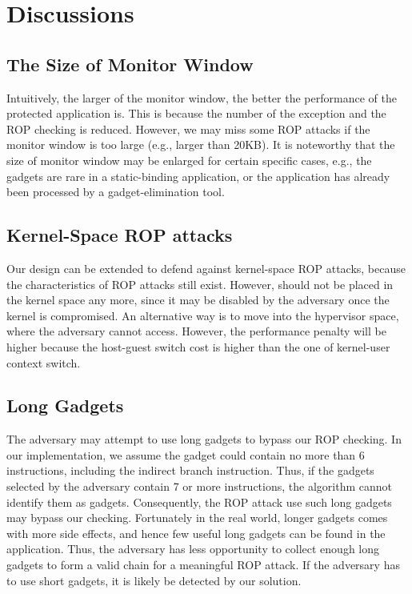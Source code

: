 \section{Discussions} \label{sec:dis}

\subsection{The Size of Monitor Window}
Intuitively, the larger of the monitor window, the better the performance of the protected application is. This is because the number of the exception and the ROP checking is reduced. However, we may miss some ROP attacks if the monitor window is too large (e.g., larger than 20KB). It is noteworthy that the size of monitor window may be enlarged for certain specific cases, e.g., the gadgets are rare in a static-binding application, or the application has already been processed by a gadget-elimination tool.



\subsection{Kernel-Space ROP attacks}
Our design can be extended to defend against kernel-space ROP attacks, because the characteristics of ROP attacks still exist.
However, \name should not be placed in the kernel space any more, since it may be disabled by the adversary once the kernel is compromised.
An alternative way is to move \name into the hypervisor space, where the adversary cannot access.
However, the performance penalty will be higher because the host-guest switch cost is higher than the one of kernel-user context switch.

\subsection{Long Gadgets}
The adversary may attempt to use long gadgets to bypass our ROP checking. In our implementation, we assume the gadget could contain no more than 6 instructions, including the indirect branch instruction. Thus, if the gadgets selected by the adversary contain 7 or more instructions, the algorithm cannot identify them as gadgets. Consequently, the ROP attack use such long gadgets may bypass our checking. Fortunately in the real world, longer gadgets comes with more side effects, and hence few useful long gadgets can be found in the application. Thus, the adversary has less opportunity to collect enough long gadgets to form a valid chain for a meaningful ROP attack. If the adversary has to use short gadgets, it is likely be detected by our solution. 

